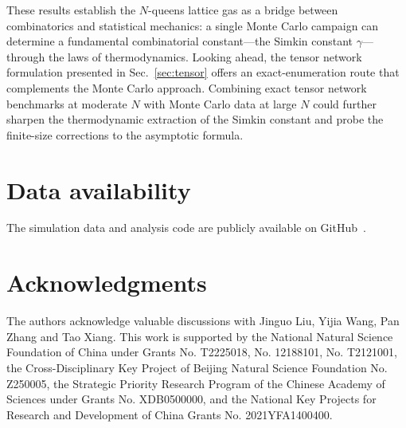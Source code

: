 \documentclass[aps, pre, reprint, amsmath, amssymb, superscriptaddress, floatfix]{revtex4-2}
\begin{document}
These results establish the $N$-queens lattice gas as a bridge
between combinatorics and statistical mechanics: a single Monte Carlo
campaign can determine a fundamental combinatorial constant---the
Simkin constant $\gamma$---through the laws of thermodynamics.
Looking ahead, the tensor network formulation presented in
Sec.~\ref{sec:tensor} offers an exact-enumeration route that
complements the Monte Carlo approach.  Combining exact tensor
network benchmarks at moderate $N$ with Monte Carlo data at large
$N$ could further sharpen the thermodynamic extraction of the Simkin
constant and probe the finite-size corrections to the asymptotic
formula.


\section{Data availability}
The simulation data and analysis code are publicly available on
GitHub~\cite{github_repo}.

\section{Acknowledgments}
The authors acknowledge valuable discussions with Jinguo Liu, Yijia Wang, Pan Zhang and Tao Xiang. This work is supported by the National Natural Science Foundation of China under Grants No. T2225018, No. 12188101, No. T2121001, the Cross-Disciplinary Key Project of Beijing Natural Science Foundation No. Z250005, the Strategic Priority Research Program of the Chinese Academy of Sciences under Grants No. XDB0500000, and the National Key Projects for Research and Development of China Grants No. 2021YFA1400400. 
\end{document}
